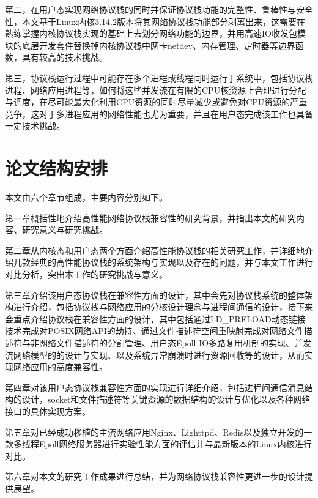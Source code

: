 第二，在用户态实现网络协议栈的同时并保证协议栈功能的完整性、鲁棒性与安全性，本文基于Linux内核3.14.2版本将其网络协议栈功能部分剥离出来，这需要在熟练掌握内核协议栈实现的基础上去划分网络功能的边界，并用高速IO收发包模块的底层开发套件替换掉内核协议栈中网卡netdev、内存管理、定时器等边界函数，具有较高的技术挑战。

第三，协议栈运行过程中可能存在多个进程或线程同时运行于系统中，包括协议栈进程、网络应用进程等，如何将这些并发流在有限的CPU核资源上合理进行分配与调度，在尽可能最大化利用CPU资源的同时尽量减少或避免对CPU资源的严重竞争，这对于多进程应用的网络性能也尤为重要，并且在用户态完成该工作也具备一定技术挑战。

\section{论文结构安排}
本文由六个章节组成，主要内容分别如下。

第一章概括性地介绍高性能网络协议栈兼容性的研究背景，并指出本文的研究内容、研究意义与研究挑战。

第二章从内核态和用户态两个方面介绍高性能协议栈的相关研究工作，并详细地介绍几款经典的高性能协议栈的系统架构与实现以及存在的问题，并与本文工作进行对比分析，突出本工作的研究挑战与意义。

第三章介绍该用户态协议栈在兼容性方面的设计，其中会先对协议栈系统的整体架构进行介绍，包括协议栈与网络应用的分核设计理念与进程间通信的设计，接下来会重点介绍协议栈在兼容性方面的设计，其中包括通过LD\_PRELOAD动态链接技术完成对POSIX网络API的劫持、通过文件描述符空间重映射完成对网络文件描述符与非网络文件描述符的分割管理、用户态Epoll IO多路复用机制的实现、并发流网络模型的的设计与实现、以及系统异常崩溃时进行资源回收等的设计，从而实现网络应用的高度兼容性。

第四章对该用户态协议栈兼容性方面的实现进行详细介绍，包括进程间通信消息结构的设计，socket和文件描述符等关键资源的数据结构的设计与优化以及各种网络接口的具体实现方案。

第五章对已经成功移植的主流网络应用Nginx、Lighttpd、Redis以及独立开发的一款多线程Epoll网络服务器进行实验性能方面的评估并与最新版本的Linux内核进行对比。

第六章对本文的研究工作成果进行总结，并为网络协议栈兼容性更进一步的设计提供展望。

